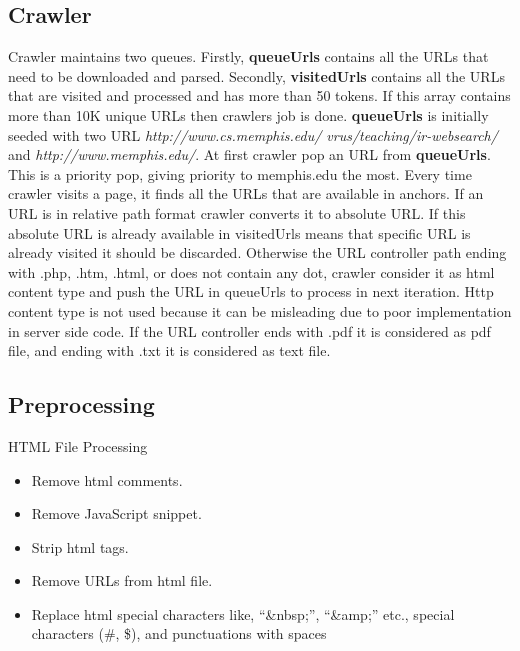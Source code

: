 \label{sec:implementation}
\subsection{Crawler}
Crawler maintains two queues. Firstly, \textbf{queueUrls} contains all the URLs that need to be
downloaded and parsed. Secondly, \textbf{visitedUrls} contains all the URLs that are visited and
processed and has more than 50 tokens. If this array contains more than 10K unique URLs then
crawlers job is done. \textbf{queueUrls} is initially seeded with two URL \textit{http://www.cs.memphis.edu/
vrus/teaching/ir-websearch/} and \textit{http://www.memphis.edu/}. At first crawler pop an URL from
\textbf{queueUrls}. This is a priority pop, giving priority to memphis.edu the most. Every time crawler visits a page, it finds all the URLs that are available in anchors. If an URL is in relative path format crawler converts it to absolute URL. If this absolute URL is already available in visitedUrls means that specific URL is already visited it should be discarded. Otherwise the URL controller path ending with .php, .htm, .html, or does not contain any dot, crawler consider
it as html content type and push the URL in queueUrls to process in next iteration. Http content
type is not used because it can be misleading due to poor implementation in server side code. If
the URL controller ends with .pdf it is considered as pdf file, and ending with .txt it is considered as text file.

\subsection{Preprocessing}
HTML File Processing
\begin{itemize}
\item Remove html comments.
\item Remove JavaScript snippet.
\item Strip html tags.
\item Remove URLs from html file.
\item Replace html special characters like, “&nbsp;”, “&amp;” etc., special characters (\#, \$), and punctuations with spaces
\end{itemize}


